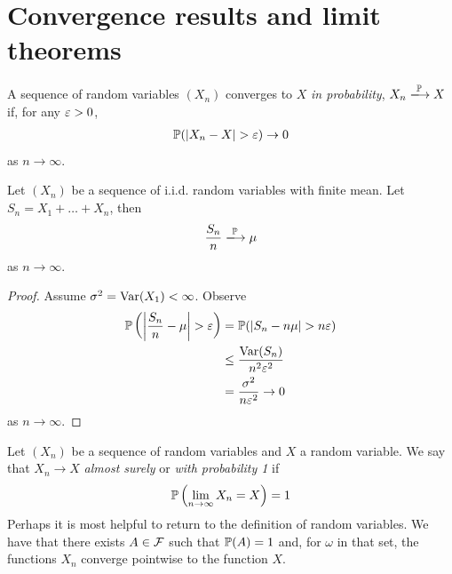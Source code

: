 \documentclass{../template/note}
\begin{document}
    \section{Convergence results and limit theorems}
    
    \begin{definition}
        A sequence of random variables \((X_n)\) converges to \(X\) \emph{in probability}, \(X_n \pto X\) if, for any \(\varepsilon > 0\),
        \begin{align*}
            \mathbb P(|X_n-X| > \varepsilon) \to 0
        \end{align*}
        as \(n \to \infty\).
    \end{definition}
    
    \begin{theorem}
        Let \((X_n)\) be a sequence of i.i.d. random variables with finite mean. Let \(S_n = X_1 + \dots + X_n\), then 
        \begin{align*}
            \frac{S_n}{n} \pto \mu
        \end{align*}
        as \(n \to \infty\).
    \end{theorem}
    
    \begin{proof}
        Assume \(\sigma^2 = \operatorname{Var}(X_1) < \infty\). Observe
        \begin{align*}
            \mathbb P\left(\left|\frac{S_n}{n}-\mu\right| > \varepsilon\right) &= \mathbb P(|S_n - n\mu| > n\varepsilon) \\
            &\leq \frac{\operatorname{Var}(S_n)}{n^2\varepsilon^2} \\
            &= \frac{\sigma^2}{n\varepsilon^2} \to 0
        \end{align*}
        as \(n \to \infty\).
    \end{proof}
    
    \begin{definition}
        Let \((X_n)\) be a sequence of random variables and \(X\) a random variable. We say that \(X_n \to X\) \emph{almost surely} or \emph{with probability 1} if
        \begin{align*}
            \mathbb P\left(\lim_{n \to \infty} X_n = X\right) = 1
        \end{align*}
        Perhaps it is most helpful to return to the definition of random variables. We have that there exists \(A \in \mathcal{F}\) such that \(\mathbb P(A) = 1\) and, for \(\omega\) in that set, the functions \(X_n\) converge pointwise to the function \(X\).
    \end{definition}
    
\end{document}
